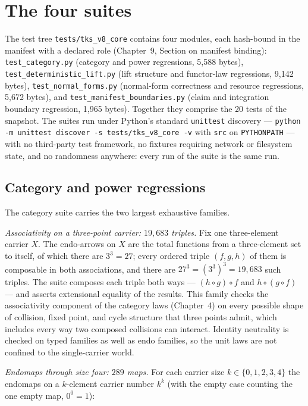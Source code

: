 \section{The four suites}\label{ch10:sec:suites}

The test tree \texttt{tests/tks\_v8\_core} contains four modules, each
hash-bound in the manifest with a declared role
(Chapter~9, Section on manifest binding): \texttt{test\_category.py}
(category and power regressions, 5{,}588 bytes),
\texttt{test\_deterministic\_lift.py} (lift structure and functor-law
regressions, 9{,}142 bytes), \texttt{test\_normal\_forms.py} (normal-form
correctness and resource regressions, 5{,}672 bytes), and
\texttt{test\_manifest\_boundaries.py} (claim and integration boundary
regression, 1{,}965 bytes). Together they comprise the 20 tests of the
snapshot. The suites run under Python's standard \texttt{unittest}
discovery --- \texttt{python -m unittest discover -s tests/tks\_v8\_core
-v} with \texttt{src} on \texttt{PYTHONPATH} --- with no third-party test
framework, no fixtures requiring network or filesystem state, and no
randomness anywhere: every run of the suite is the same run.

\subsection{Category and power regressions}\label{ch10:sec:cat-suite}

The category suite carries the two largest exhaustive families.

\emph{Associativity on a three-point carrier: $19{,}683$ triples.} Fix one
three-element carrier $X$. The endo-arrows on $X$ are the total functions
from a three-element set to itself, of which there are $3^3 = 27$; every
ordered triple $(f, g, h)$ of them is composable in both associations, and
there are $27^3 = (3^3)^3 = 19{,}683$ such triples. The suite composes
each triple both ways --- $(h \circ g) \circ f$ and $h \circ (g \circ f)$
--- and asserts extensional equality of the results. This family checks
the associativity component of the category laws (Chapter~4) on every
possible shape of collision, fixed point, and cycle structure that three
points admit, which includes every way two composed collisions can
interact. Identity neutrality is checked on typed families as well as
endo families, so the unit laws are not confined to the single-carrier
world.

\emph{Endomaps through size four: $289$ maps.} For each carrier size
$k \in \{0, 1, 2, 3, 4\}$ the endomaps on a $k$-element carrier number
$k^k$ (with the empty case counting the one empty map, $0^0 = 1$):

